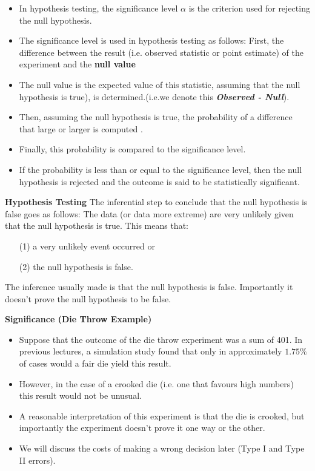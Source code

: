 \documentclass[a4]{beamer}
\begin{document}
\begin{itemize}
\item In hypothesis testing, the significance level $\alpha$ is the criterion used for rejecting the null hypothesis. \item The significance level is used in hypothesis testing as follows: First, the difference between the result (i.e. observed statistic or point estimate)  of the experiment and the \textbf{null value} \item The null value is the expected value of this statistic, assuming that the null hypothesis is true), is determined.(i.e.we denote this  \textbf{\textit{Observed - Null}}). \item Then, assuming the null hypothesis is true, the probability of a difference that large or larger is computed . \item Finally, this probability is compared to the significance level.\item  If the probability is less than or equal to the significance level, then the null hypothesis is rejected and the outcome is said to be statistically significant.
\end{itemize}



\noindent \textbf{Hypothesis Testing}
The inferential step to conclude that the null hypothesis is false goes as follows: The data (or data more extreme) are very unlikely given that the null hypothesis is true.
\bigskip
This means that:
\begin{itemize}
\item[(1)] a very unlikely event occurred or
\item[(2)] the null hypothesis is false.
\end{itemize}
\bigskip
The inference usually made is that the null hypothesis is false. Importantly it doesn't prove the null hypothesis to be false.




\noindent \textbf{Significance (Die Throw Example)}
\begin{itemize}
\item Suppose that the outcome of the die throw experiment was a sum of 401. In previous lectures, a simulation study found that only in approximately $1.75\%$ of cases would a fair die yield this result.
\item However, in the case of a crooked die (i.e. one that favours high numbers) this result would not be unusual.
\item A reasonable interpretation of this experiment is that the die is crooked, but importantly the experiment doesn't prove it one way or the other.
\item We will discuss the costs of making a wrong decision later (Type I and Type II errors).
\end{itemize}
\end{document}
